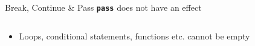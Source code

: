         \begin{frame}{Break, Continue \& Pass}
            \pause
            \LARGE
            \textbf{\texttt{pass}} does not have an effect
            \bigskip  
            \inputminted[frame=single,framesep=2pt]{python3}{../Lecture3/code-examples/pass.py}
            \pause
            \begin{itemize}
                \item Loops, conditional statements, functions etc. cannot be empty 
            \end{itemize}
        \end{frame}
